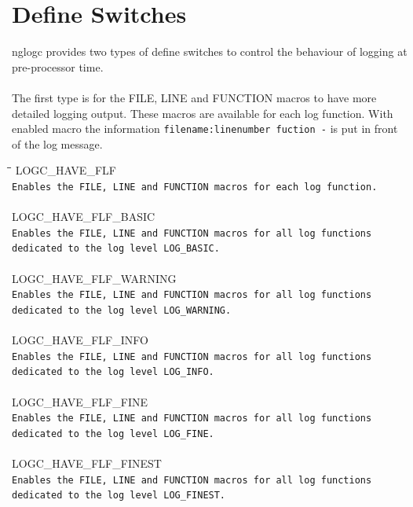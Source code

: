 \documentclass[a4paper, titlepage, 11pt]{article}
\begin{document}
\newpage

\section{Define Switches}

nglogc provides two types of define switches to control the behaviour of logging
at pre-processor time. \\ \\
The first type is for the FILE, LINE and FUNCTION macros to have more detailed
logging output. These macros are available for each log function. With enabled
macro the information \small\verb+filename:linenumber fuction -+ \normalsize  is put in front of the log message.
\begin{tabbing}
\hspace*{1cm}\=\hspace*{2cm}\=\hspace*{0,6cm}\= \kill
\> LOGC\_HAVE\_FLF \\
\> \small\verb+Enables the FILE, LINE and FUNCTION macros for each log function.+ \\ \\

\> LOGC\_HAVE\_FLF\_BASIC \\
\> \small\verb+Enables the FILE, LINE and FUNCTION macros for all log functions+ \\
\> \small\verb+dedicated to the log level LOG_BASIC.+ \\ \\

\> LOGC\_HAVE\_FLF\_WARNING \\
\> \small\verb+Enables the FILE, LINE and FUNCTION macros for all log functions+ \\
\> \small\verb+dedicated to the log level LOG_WARNING.+ \\ \\

\> LOGC\_HAVE\_FLF\_INFO \\
\> \small\verb+Enables the FILE, LINE and FUNCTION macros for all log functions+ \\
\> \small\verb+dedicated to the log level LOG_INFO.+ \\ \\

\> LOGC\_HAVE\_FLF\_FINE \\
\> \small\verb+Enables the FILE, LINE and FUNCTION macros for all log functions+ \\
\> \small\verb+dedicated to the log level LOG_FINE.+ \\ \\

\> LOGC\_HAVE\_FLF\_FINEST \\
\> \small\verb+Enables the FILE, LINE and FUNCTION macros for all log functions+ \\
\> \small\verb+dedicated to the log level LOG_FINEST.+ \\ \\
\end{tabbing}
\end{document}
